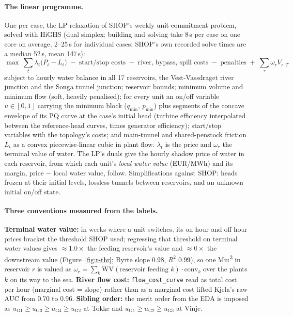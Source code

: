 \documentclass[11pt]{article}
\begin{document}
\paragraph{The linear programme.} One per case, the LP relaxation of SHOP's weekly unit-commitment
problem, solved with HiGHS (dual simplex; building and solving take 8\,s per case on one core on
average, 2--25\,s for individual cases; SHOP's own recorded solve times are a median 52\,s, mean
147\,s):
\[
\max\ \sum_t \lambda_t \big(P_t - L_t\big) \;-\; \text{start/stop costs} \;-\; \text{river, bypass, spill costs}
\;-\; \text{penalties} \;+\; \sum_r \omega_r V_{r,T}
\]
subject to hourly water balance in all 17 reservoirs, the Vest-Vassdraget river junction and the
Songa tunnel junction; reservoir bounds; minimum volume and minimum flow (soft, heavily penalised);
for every unit an on/off variable $u\in[0,1]$ carrying the minimum block ($q_{\min}$, $p_{\min}$)
plus segments of the concave envelope of its PQ curve at the case's initial head (turbine efficiency
interpolated between the reference-head curves, times generator efficiency); start/stop variables
with the topology's costs; and main-tunnel and shared-penstock friction $L_t$ as a convex
piecewise-linear cubic in plant flow. $\lambda_t$ is the price and $\omega_r$ the terminal value of
water. The LP's duals give the hourly shadow price of water in each reservoir, from which each unit's
\emph{local water value} (EUR/MWh) and its margin, price $-$ local water value, follow.
Simplifications against SHOP: heads frozen at their initial levels, lossless tunnels between
reservoirs, and an unknown initial on/off state.

\paragraph{Three conventions measured from the labels.} \textbf{Terminal water value:} in weeks where
a unit switches, its on-hour and off-hour prices bracket the threshold SHOP used; regressing that
threshold on terminal water values gives $\approx 1.0\times$ the feeding reservoir's value and
$\approx 0\times$ the downstream value (Figure~\ref{fig:r-thr}; Byrte slope 0.98, $R^2$ 0.99), so one
Mm\textsuperscript{3} in reservoir $r$ is valued as
$\omega_r=\sum_k \mathrm{WV}(\text{reservoir feeding }k)\cdot \mathrm{conv}_k$ over the plants $k$ on
its way to the sea. \textbf{River flow cost:} \texttt{flow\_cost\_curve} read as total cost per hour
(marginal cost = slope) rather than as a marginal cost lifted Kjela's raw AUC from 0.70 to 0.96.
\textbf{Sibling order:} the merit order from the EDA is imposed as
$u_{\text{G1}}\ge u_{\text{G3}}\ge u_{\text{G4}}\ge u_{\text{G2}}$ at Tokke and
$u_{\text{G1}}\ge u_{\text{G2}}\ge u_{\text{G3}}$ at Vinje.
\end{document}
